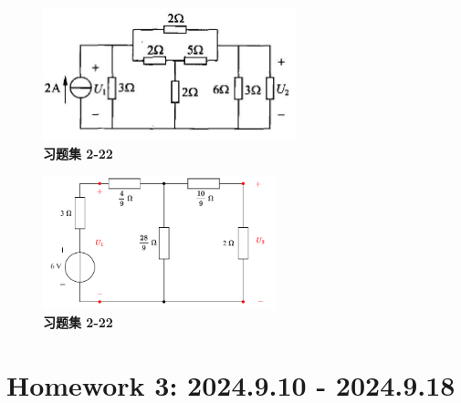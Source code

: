 \documentclass[UTF8]{report}
\theoremstyle{MyLineTheoremStyle} %
\theoremstyle{MyBlockTheoremStyle} %
\theoremstyle{MySubsubsectionStyle} %
\begin{document}
\noindent\begin{minipage}{0.49\textwidth}
\begin{figure}[H]\centering
\includegraphics[height=110pt]{assets/2/0c8d1f0fb90ef6983c0aef6451919e4b.jpg}
\caption{\textbf{习题集 2-22}}
\end{figure}
\end{minipage}\hfill
\begin{minipage}{0.49\textwidth}
\begin{figure}[H]\centering
\includegraphics[height=110pt]{assets/2/2-22.drawio.pdf}
\caption{\textbf{习题集 2-22}}\label{2-22}
\end{figure}
\end{minipage}




\chapter{Homework 3: 2024.9.10 - 2024.9.18}
\thispagestyle{fancy}
\end{document}
